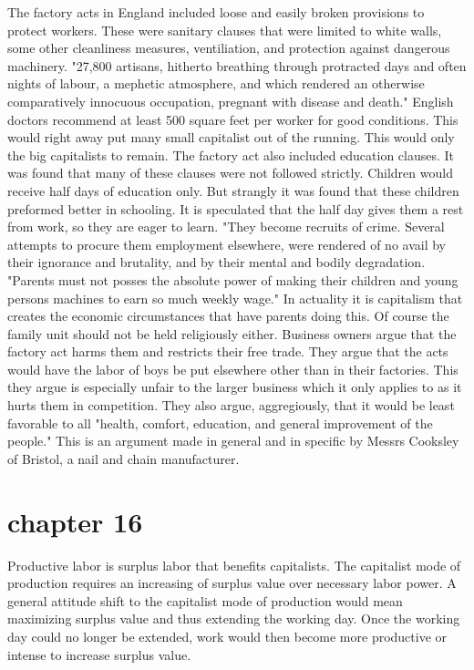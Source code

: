 \documentclass{article}
\begin{document}
The factory acts in England included loose and easily broken provisions to protect workers. These were sanitary clauses that were limited to white walls, some other cleanliness measures, ventiliation, and protection against dangerous machinery. "27,800 artisans, hitherto breathing through protracted days and often nights of labour, a mephetic atmosphere, and which rendered an otherwise comparatively innocuous occupation, pregnant with disease and death." English doctors recommend at least 500 square feet per worker for good conditions. This would right away put many small capitalist out of the running. This would only the big capitalists to remain. The factory act also included education clauses. It was found that many of these clauses were not followed strictly. Children would receive half days of education only. But strangly it was found that these children preformed better in schooling. It is speculated that the half day gives them a rest from work, so they are eager to learn. "They become recruits of crime. Several attempts to procure them employment elsewhere, were rendered of no avail by their ignorance and brutality, and by their mental and bodily degradation. "Parents must not posses the absolute power of making their children and young persons machines to earn so much weekly wage." In actuality it is capitalism that creates the economic circumstances that have parents doing this. Of course the family unit should not be held religiously either. Business owners argue that the factory act harms them and restricts their free trade. They argue that the acts would have the labor of boys be put elsewhere other than in their factories. This they argue is especially unfair to the larger business which it only applies to as it hurts them in competition. They also argue, aggregiously, that it would be least favorable to all "health, comfort, education, and general improvement of the people." This is an argument made in general and in specific by Messrs Cooksley of Bristol, a nail and chain manufacturer.

\section{chapter 16}
Productive labor is surplus labor that benefits capitalists. The capitalist mode of production requires an increasing of surplus value over necessary labor power. A general attitude shift to the capitalist mode of production would mean maximizing surplus value and thus extending the working day. Once the working day could no longer be extended, work would then become more productive or intense to increase surplus value. 
\end{document}
